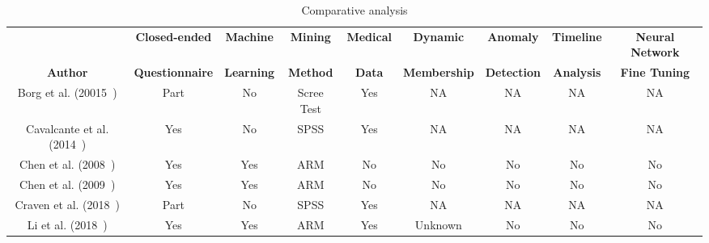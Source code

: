 \begin{landscape}
    \begin{table}[htbp]
        \caption{Comparative analysis}
        \label{tab:TBL_Comparative_Analisys}
        \centering
        \small
        \setlength\tabcolsep{2pt}
        \begin{tabular}{|c|c|c|c|c|c|c|c|c|}
            \hline
                                                                     & \textbf{Closed-ended}  & \textbf{Machine}  & \textbf{Mining}     & \textbf{Medical} & \textbf{Dynamic}    & \textbf{Anomaly}   & \textbf{Timeline} & \textbf{Neural Network} \\
            \textbf{Author}                                          & \textbf{Questionnaire} & \textbf{Learning} & \textbf{Method}     & \textbf{Data}    & \textbf{Membership} & \textbf{Detection} & \textbf{Analysis} & \textbf{Fine Tuning}    \\
            \hline
            Borg et al. (20015~\cite{borg2015development})           & Part                   & No                & Scree Test          & Yes              & NA                  & NA                 & NA                & NA                      \\
            \hline
            Cavalcante et al. (2014~\cite{cavalcante2014low})        & Yes                    & No                & SPSS                & Yes              & NA                  & NA                 & NA                & NA                      \\
            \hline
            Chen et al. (2008~\cite{chen2008mining})                 & Yes                    & Yes               & ARM                 & No               & No                  & No                 & No                & No                      \\
            \hline
            Chen et al. (2009~\cite{chen2009mining})                 & Yes                    & Yes               & ARM                 & No               & No                  & No                 & No                & No                      \\
            \hline
            Craven et al. (2018~\cite{craven2018community})          & Part                   & No                & SPSS                & Yes              & NA                  & NA                 & NA                & NA                      \\
            \hline
            Li et al. (2018~\cite{li2018development})                & Yes                    & Yes               & ARM                 & Yes              & Unknown             & No                 & No                & No                      \\

\end{tabular}
\end{table}
\end{landscape}
